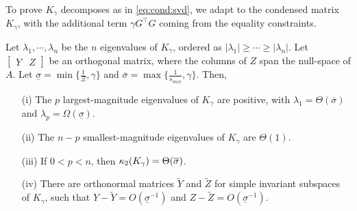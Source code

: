 To prove $K_\gamma$ decomposes as in \eqref{eq:cond:svd},
we adapt \cite[Theorem 3.2]{wright1998ill} to the
condensed matrix $K_\gamma$, with the additional term
$\gamma G^\top G$ coming from the equality constraints.
\begin{theorem}
  \label{thm:cond}
  Let $\lambda_1, \cdots, \lambda_n$ be the $n$ eigenvalues of
  $K_\gamma$, ordered as $|\lambda_1| \geq  \cdots \geq |\lambda_n|$.
  Let $\begin{bmatrix} Y & Z \end{bmatrix}$ be an orthogonal
  matrix, where the columns of $Z$ span the null-space of
  $A$. Let $\underline{\sigma} =\min\{\frac{1}{\Xi}, \gamma\}$
  and $\overline{\sigma} = \max\{\frac{1}{s_{min}}, \gamma\}$.
  Then,
  \begin{enumerate}
    \item[(i)] The $p$ largest-magnitude eigenvalues of $K_\gamma$ are positive,
      with $\lambda_1 = \Theta(\overline{\sigma})$ and $\lambda_p = \Omega(\underline{\sigma})$.
    \item[(ii)] The $n-p$ smallest-magnitude eigenvalues of $K_\gamma$
      are $\Theta(1)$.
    \item[(iii)] If $0 < p < n$, then $\kappa_2(K_\gamma) = \Theta(\overline{\sigma})$.
    \item[(iv)] There are orthonormal matrices $\widetilde{Y}$ and $\widetilde{Z}$ for
      simple invariant subspaces of $K_\gamma$, such that $Y - \widetilde{Y} = O(\underline{\sigma}^{-1})$
      and $Z - \widetilde{Z} = O(\underline{\sigma}^{-1})$.
  \end{enumerate}
\end{theorem}
